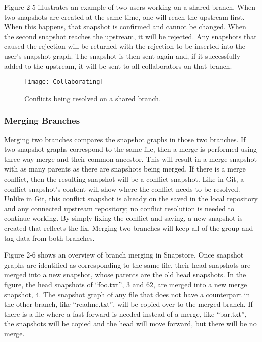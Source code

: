 Figure 2-5 illustrates an example of two users working on a shared branch. When two snapshots are created at the same time, one will reach the upstream first. When this happens, that snapshot is confirmed and cannot be changed. When the second snapshot reaches the upstream, it will be rejected. Any snapshots that caused the rejection will be returned with the rejection to be inserted into the user's snapshot graph. The snapshot is then sent again and, if it successfully added to the upstream, it will be sent to all collaborators on that branch.

\begin{figure}
\texttt{[image: Collaborating]}
\caption{Conflicts being resolved on a shared branch.}
\label{arm:fig1}
\end{figure}

\subsubsection{Merging Branches}

Merging two branches compares the snapshot graphs in those two branches. If two snapshot graphs correspond to the same file, then a merge is performed using three way merge and their common ancestor. This will result in a merge snapshot with as many parents as there are snapshots being merged. If there is a merge conflict, then the resulting snapshot will be a conflict snapshot. Like in Git, a conflict snapshot's content will show where the conflict needs to be resolved. Unlike in Git, this conflict snapshot is already on the saved in the local repository and any connected upstream repository; no conflict resolution is needed to continue working. By simply fixing the conflict and saving, a new snapshot is created that reflects the fix. Merging two branches will keep all of the group and tag data from both branches.

Figure 2-6 shows an overview of branch merging in Snapstore. Once snapshot graphs are identified as corresponding to the same file, their head snapshots are merged into a new snapshot, whose parents are the old head snapshots. In the figure, the head snapshots of ``foo.txt'', $3$ and $62$, are merged into a new merge snapshot, $4$. The snapshot graph of any file that does not have a counterpart in the other branch, like ``readme.txt'', will be copied over to the merged branch. If there is a file where a fast forward is needed instead of a merge, like ``bar.txt'', the snapshots will be copied and the head will move forward, but there will be no merge. 

